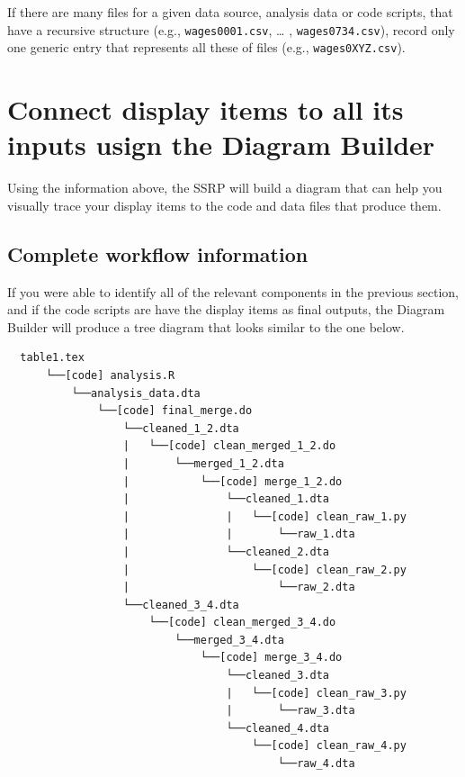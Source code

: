 \documentclass[
  openany]{book}
\begin{document}
If there are many files for a given data source, analysis data or code scripts, that have a recursive structure (e.g., \texttt{wages0001.csv}, \ldots{} , \texttt{wages0734.csv}), record only one generic entry that represents all these of files (e.g., \texttt{wages0XYZ.csv}).

\hypertarget{diagram}{%
\section{Connect display items to all its inputs usign the Diagram Builder}\label{diagram}}

Using the information above, the SSRP will build a diagram that can help you visually trace your display items to the code and data files that produce them.

\hypertarget{complete-tree}{%
\subsection{Complete workflow information}\label{complete-tree}}

If you were able to identify all of the relevant components in the previous section, and if the code scripts are have the display items as final outputs, the Diagram Builder will produce a tree diagram that looks similar to the one below.

\begin{verbatim}
  table1.tex
      └──[code] analysis.R
          └──analysis_data.dta
              └──[code] final_merge.do
                  └──cleaned_1_2.dta
                  |   └──[code] clean_merged_1_2.do
                  |       └──merged_1_2.dta
                  |           └──[code] merge_1_2.do
                  |               └──cleaned_1.dta
                  |               |   └──[code] clean_raw_1.py
                  |               |       └──raw_1.dta
                  |               └──cleaned_2.dta
                  |                   └──[code] clean_raw_2.py
                  |                       └──raw_2.dta
                  └──cleaned_3_4.dta
                      └──[code] clean_merged_3_4.do
                          └──merged_3_4.dta
                              └──[code] merge_3_4.do
                                  └──cleaned_3.dta
                                  |   └──[code] clean_raw_3.py
                                  |       └──raw_3.dta
                                  └──cleaned_4.dta
                                      └──[code] clean_raw_4.py
                                          └──raw_4.dta
\end{verbatim}
\end{document}
